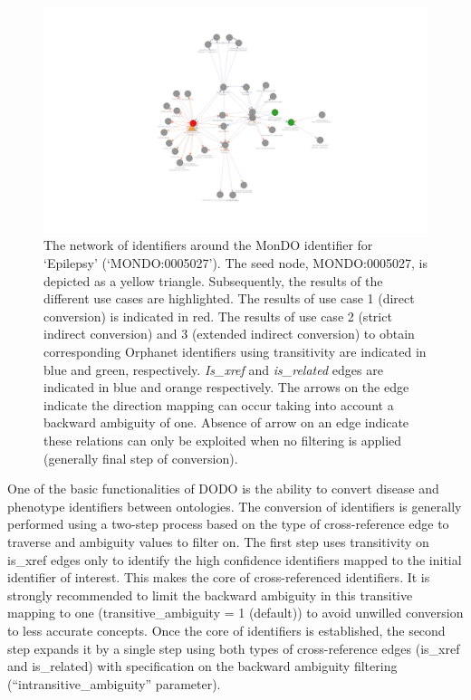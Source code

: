 \documentclass[9pt,a4paper,]{extarticle}
\begin{document}
\begin{figure}

{\centering \includegraphics[width=1.2\linewidth]{DODO-F1000-publication_files/figure-latex/extension-1} 

}

\caption{The network of identifiers around the MonDO identifier for `Epilepsy' (`MONDO:0005027'). The seed node, MONDO:0005027, is depicted as a yellow triangle. Subsequently, the results of the different use cases are highlighted. The results of use case 1 (direct conversion) is indicated in red. The results of use case 2 (strict indirect conversion) and 3 (extended indirect conversion) to obtain corresponding Orphanet identifiers using transitivity are indicated in blue and green, respectively. \emph{Is\_xref} and \emph{is\_related} edges are indicated in blue and orange respectively. The arrows on the edge indicate the direction mapping can occur taking into account a backward ambiguity of one. Absence of arrow on an edge indicate these relations can only be exploited when no filtering is applied (generally final step of conversion).}\label{fig:extension}
\end{figure}

One of the basic functionalities of DODO is the ability to convert disease and phenotype identifiers between ontologies. The conversion of identifiers is generally performed using a two-step process based on the type of cross-reference edge to traverse and ambiguity values to filter on. The first step uses transitivity on is\_xref edges only to identify the high confidence identifiers mapped to the initial identifier of interest. This makes the core of cross-referenced identifiers. It is strongly recommended to limit the backward ambiguity in this transitive mapping to one (transitive\_ambiguity = 1 (default)) to avoid unwilled conversion to less accurate concepts. Once the core of identifiers is established, the second step expands it by a single step using both types of cross-reference edges (is\_xref and is\_related) with specification on the backward ambiguity filtering (``intransitive\_ambiguity'' parameter).
\end{document}
